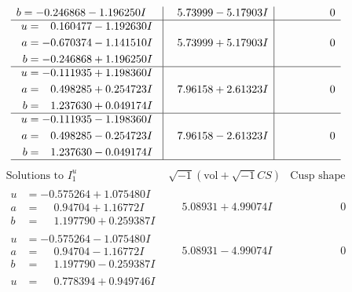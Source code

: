 \documentclass[1p]{elsarticle_modified}
\theoremstyle{definition}
\newcommand{\I}{\sqrt{-1}}
\begin{document}
$$\begin{array}{c|c|c}
\begin{aligned}
b &= -0.246868 - 1.196250 I\end{aligned}
 & \phantom{-}5.73999 - 5.17903 I & \phantom{-0.000000 } 0 \\ \hline\begin{aligned}
u &= \phantom{-}0.160477 - 1.192630 I \\
a &= -0.670374 - 1.141510 I \\
b &= -0.246868 + 1.196250 I\end{aligned}
 & \phantom{-}5.73999 + 5.17903 I & \phantom{-0.000000 } 0 \\ \hline\begin{aligned}
u &= -0.111935 + 1.198360 I \\
a &= \phantom{-}0.498285 + 0.254723 I \\
b &= \phantom{-}1.237630 + 0.049174 I\end{aligned}
 & \phantom{-}7.96158 + 2.61323 I & \phantom{-0.000000 } 0 \\ \hline\begin{aligned}
u &= -0.111935 - 1.198360 I \\
a &= \phantom{-}0.498285 - 0.254723 I \\
b &= \phantom{-}1.237630 - 0.049174 I\end{aligned}
 & \phantom{-}7.96158 - 2.61323 I & \phantom{-0.000000 } 0\\
 \hline 
 \end{array}$$\newpage$$\begin{array}{c|c|c}  
\text{Solutions to }I^u_{1}& \I (\text{vol} + \sqrt{-1}CS) & \text{Cusp shape}\\
 \hline 
\begin{aligned}
u &= -0.575264 + 1.075480 I \\
a &= \phantom{-}0.94704 + 1.16772 I \\
b &= \phantom{-}1.197790 + 0.259387 I\end{aligned}
 & \phantom{-}5.08931 + 4.99074 I & \phantom{-0.000000 } 0 \\ \hline\begin{aligned}
u &= -0.575264 - 1.075480 I \\
a &= \phantom{-}0.94704 - 1.16772 I \\
b &= \phantom{-}1.197790 - 0.259387 I\end{aligned}
 & \phantom{-}5.08931 - 4.99074 I & \phantom{-0.000000 } 0 \\ \hline\begin{aligned}
u &= \phantom{-}0.778394 + 0.949746 I \\

\end{aligned}
\end{array}$$
\end{document}
